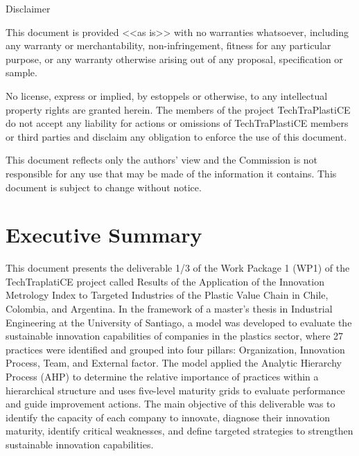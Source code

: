 \documentclass[
  12pt,
  oneside]{book}
\renewcommand*\contentsname{Table of contents}
\newcommand\contentsname{Table of contents}
\begin{document}
\begin{frontmatter}
\begin{titlepage}
  \vfill


  

    
    
    \vfill
    
    {\scriptsize\centering\color{lightgray} 
    
    Disclaimer
    
    This document is provided <<as is>> with no warranties whatsoever, 
    including any warranty or merchantability, non-infringement, fitness for any particular 
    purpose, or any warranty otherwise arising out of any proposal, specification or sample.  
    
    No license, express or implied, by estoppels or otherwise, to any intellectual 
    property rights are granted herein. 
    The members of the project TechTraPlastiCE do not accept any liability for actions or 
    omissions of TechTraPlastiCE members or third parties and disclaim any obligation 
    to enforce the use of this document. 
    
    This document reflects only the authors' view and the Commission is not responsible 
    for any use that may be made of the information it contains.  
    This document is subject to change without notice. 
    
    }
    \normalsize
    
    
    
      \end{titlepage}
  \end{frontmatter}

\renewcommand*\contentsname{Contents}
{
\setcounter{tocdepth}{2}
\tableofcontents
}
\listoffigures
\listoftables

\mainmatter
\chapter*{Executive Summary}\label{executive-summary}

This document presents the deliverable 1/3 of the Work Package 1 (WP1)
of the TechTraplatiCE project called Results of the Application of the
Innovation Metrology Index to Targeted Industries of the Plastic Value
Chain in Chile, Colombia, and Argentina. In the framework of a master's
thesis in Industrial Engineering at the University of Santiago, a model
was developed to evaluate the sustainable innovation capabilities of
companies in the plastics sector, where 27 practices were identified and
grouped into four pillars: Organization, Innovation Process, Team, and
External factor. The model applied the Analytic Hierarchy Process (AHP)
to determine the relative importance of practices within a hierarchical
structure and uses five-level maturity grids to evaluate performance and
guide improvement actions. The main objective of this deliverable was to
identify the capacity of each company to innovate, diagnose their
innovation maturity, identify critical weaknesses, and define targeted
strategies to strengthen sustainable innovation capabilities.
\end{document}

